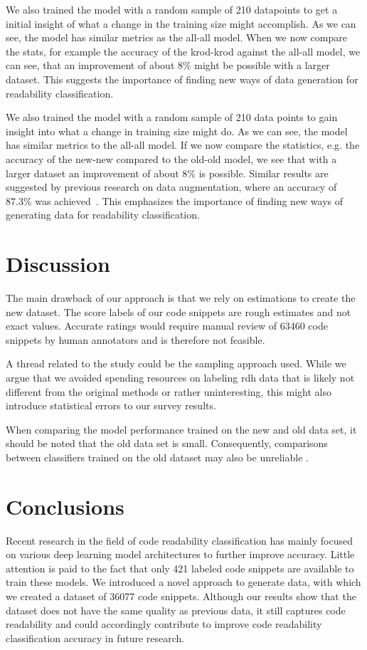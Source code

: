 \documentclass[%
class=scrreprt,
chapterprefix=false,%
open=right,%
twoside=false,%
paper=a4,%
logofile={Logo\_zentral\_farbig\_EN.png},%
thesistype=master,%
UKenglish,%
]{se2thesis}
\theoremstyle{definition}
\newcommand{\numSamples}{36077 }
\begin{document}
	We also trained the model with a random sample of 210 datapoints to get a initial insight of what a change in the training size might accomplish. As we can see, the model has similar metrics as the all-all model. When we now compare the stats, for example the accuracy of the krod-krod against the all-all model, we can see, that an improvement of about 8\% might be possible with a larger dataset. This suggests the importance of finding new ways of data generation for readability classification.
	
	We also trained the model with a random sample of 210 data points to gain insight into what a change in training size might do. As we can see, the model has similar metrics to the all-all model. If we now compare the statistics, e.g. the accuracy of the new-new compared to the old-old model, we see that with a larger dataset an improvement of about 8\% is possible. Similar results are suggested by previous research on data augmentation, where an accuracy of 87.3\% was achieved~\citeauthor{mi2021effectiveness}. This emphasizes the importance of finding new ways of generating data for readability classification. 
	
\section{Discussion} \label{Discussion}

	The main drawback of our approach is that we rely on estimations to create the new dataset. The score labels of our code snippets are rough estimates and not exact values. Accurate ratings would require manual review of 63460 code snippets by human annotators and is therefore not feasible.
	
	A thread related to the study could be the sampling approach used. While we argue that we avoided spending resources on labeling rdh data that is likely not different from the original methods or rather uninteresting, this might also introduce statistical errors to our survey results.
	
	When comparing the model performance trained on the new and old data set, it should be noted that the old data set is small. Consequently, comparisons between classifiers trained on the old dataset may also be unreliable \cite{mi2022towards}.
	
\section{Conclusions} \label{Conclusions}
	Recent research in the field of code readability classification has mainly focused on various deep learning model architectures to further improve accuracy. Little attention is paid to the fact that only 421 labeled code snippets are available to train these models. We introduced a novel approach to generate data, with which we created a dataset of \numSamples code snippets. Although our results show that the dataset does not have the same quality as previous data, it still captures code readability and could accordingly contribute to improve code readability classification accuracy in future research.
	
\end{document}
